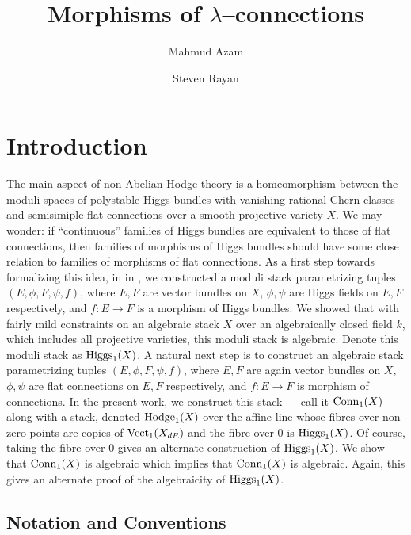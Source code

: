 \documentclass[11pt]{amsart}
\title[Morphisms of {$\lambda$}--connections]
      {Morphisms of {$\lambda$}--connections}
\author{Mahmud Azam}
\author{Steven Rayan}
\begin{document}
\begin{abstract}
\end{abstract}

\maketitle

\tableofcontents

\section{Introduction}

The main aspect of non-Abelian Hodge theory
is a homeomorphism between the moduli spaces of polystable Higgs bundles
with vanishing rational Chern classes and semisimiple flat connections over
a smooth projective variety $X$. We may wonder:
if ``continuous'' families of Higgs bundles are equivalent to those of flat
connections, then families of morphisms of Higgs bundles should have some close
relation to families of morphisms of flat connections.
As a first step towards formalizing this idea, in \cite{ModQuivBun}
in \cite{ModQuivBun}, we constructed a moduli stack parametrizing tuples
$(E, \phi, F, \psi, f)$, where $E, F$ are vector bundles on $X$,
$\phi, \psi$ are Higgs fields on $E, F$ respectively, and $f : E \to F$
is a morphism of Higgs bundles. We showed that with fairly mild constraints
on an algebraic stack $X$ over an algebraically closed field $k$, which includes
all projective varieties, this moduli stack is algebraic.
Denote this moduli stack as $\mathrm{Higgs}_1(X)$. A natural next step is
to construct an algebraic stack parametrizing tuples $(E, \phi, F, \psi, f)$,
where $E, F$ are again vector bundles on $X$, $\phi, \psi$ are flat connections
on $E, F$ respectively, and $f : E \to F$ is morphism of connections.
In the present work, we construct this stack --- call it $\mathrm{Conn}_1(X)$ ---
along with a stack, denoted $\mathrm{Hodge}_1(X)$ over the affine line whose fibres over
non-zero points are copies of $\mathrm{Vect}_1(X_{dR})$ and the fibre over $0$ is
$\mathrm{Higgs}_1(X)$. Of course, taking the fibre over $0$ gives an alternate
construction of $\mathrm{Higgs}_1(X)$. We show that $\mathrm{Conn}_1(X)$ is algebraic
which implies that $\mathrm{Conn}_1(X)$ is algebraic. Again, this gives an alternate
proof of the algebraicity of $\mathrm{Higgs}_1(X)$.

\subsection{Notation and Conventions}
\end{document}
